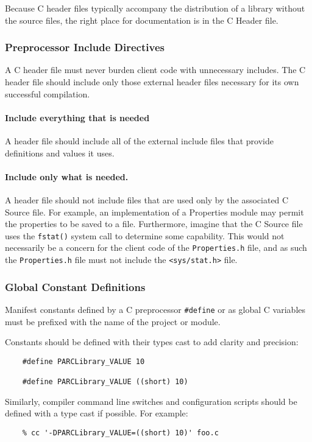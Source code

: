 \documentclass[fleqn,12pt]{PARCOneColumn} %
\begin{document}
Because C header files typically accompany the distribution of a library without the source files, the right place for documentation is in the C Header file.

\subsubsection{Preprocessor Include Directives}
A C header file must never burden client code with unnecessary includes.
The C header file should include only those external header files necessary for its own successful compilation.

\paragraph{Include everything that is needed}
A header file should include all of the external include files that provide definitions and values it uses. 


\paragraph{Include only what is needed.}
A header file should not include files that are used only by the associated C Source file. For example, an implementation of a Properties module may permit the properties to be saved to a file.
Furthermore, imagine that the C Source file uses the {\tt fstat()} system call to determine some capability.
This would not necessarily be a concern for the client code of the {\tt Properties.h} file,
and as such the {\tt Properties.h} file must not include the {\tt <sys/stat.h>} file.

\subsubsection{Global Constant Definitions}
Manifest constants defined by a C preprocessor {\tt \#define} or as global C variables must be prefixed with the name
of the project or module.

Constants should be defined with their types cast to add clarity and precision:

\begin{lstlisting}
    #define PARCLibrary_VALUE 10

    #define PARCLibrary_VALUE ((short) 10)
\end{lstlisting}

Similarly, compiler command line switches and configuration scripts should be defined with a type cast if possible.
For example:
\begin{lstlisting}
    % cc '-DPARCLibrary_VALUE=((short) 10)' foo.c
\end{lstlisting}
\end{document}
